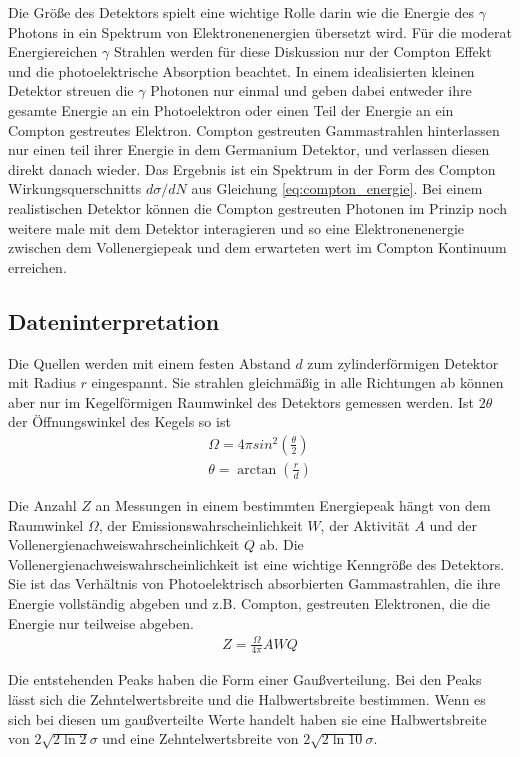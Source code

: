 Die Größe des Detektors spielt eine wichtige Rolle darin wie die Energie des
$\gamma$ Photons in ein Spektrum von Elektronenenergien übersetzt wird. Für die
moderat Energiereichen $\gamma$ Strahlen werden für diese Diskussion nur der
Compton Effekt und die photoelektrische Absorption beachtet. In einem
idealisierten kleinen Detektor streuen die $\gamma$ Photonen nur einmal und
geben dabei entweder ihre gesamte Energie an ein Photoelektron oder einen Teil
der Energie an ein Compton gestreutes Elektron. Compton gestreuten
Gammastrahlen hinterlassen nur einen teil ihrer Energie in dem Germanium
Detektor, und verlassen diesen direkt danach wieder. Das Ergebnis ist ein
Spektrum in der Form des Compton Wirkungsquerschnitts $d\sigma/dN$ aus
Gleichung \eqref{eq:compton_energie}. Bei einem realistischen Detektor können
die Compton gestreuten Photonen im Prinzip noch weitere male mit dem Detektor
interagieren und so eine Elektronenenergie zwischen dem Vollenergiepeak und dem
erwarteten wert im Compton Kontinuum erreichen.

\subsection{Dateninterpretation}

Die Quellen werden mit einem festen Abstand $d$ zum zylinderförmigen Detektor
mit Radius $r$ eingespannt. Sie strahlen gleichmäßig in alle Richtungen ab
können aber nur im Kegelförmigen Raumwinkel des Detektors gemessen werden. Ist
$2\theta$ der Öffnungswinkel des Kegels so ist \cite{wiki:raum}
\begin{align}
	\Omega = 4 \pi sin^2\left(\frac{\theta}{2}\right) \\
	\theta = \arctan \left(\frac{r}{d} \right)
\end{align}\label{eq:raumwinkel}

Die Anzahl $Z$ an Messungen in einem bestimmten Energiepeak hängt von dem
Raumwinkel $\Omega$, der Emissionswahrscheinlichkeit $W$, der Aktivität $A$ und
der Vollenergienachweiswahrscheinlichkeit $Q$ ab. Die
Vollenergienachweiswahrscheinlichkeit ist eine wichtige Kenngröße des
Detektors. Sie ist das Verhältnis von Photoelektrisch absorbierten
Gammastrahlen, die ihre Energie vollständig abgeben und z.B. Compton,
gestreuten Elektronen, die die Energie nur teilweise abgeben.
\begin{align}
	Z = \frac{\Omega}{4\pi} A W Q
	\label{eq:Q}
\end{align}

Die entstehenden Peaks haben die Form einer Gaußverteilung. Bei den Peaks lässt
sich die Zehntelwertsbreite und die Halbwertsbreite bestimmen. Wenn es sich bei
diesen um gaußverteilte Werte handelt haben sie eine Halbwertsbreite von
$2\sqrt{2\ln 2} \sigma$ und eine Zehntelwertsbreite von $2 \sqrt{2\ln
		10}\sigma$.

